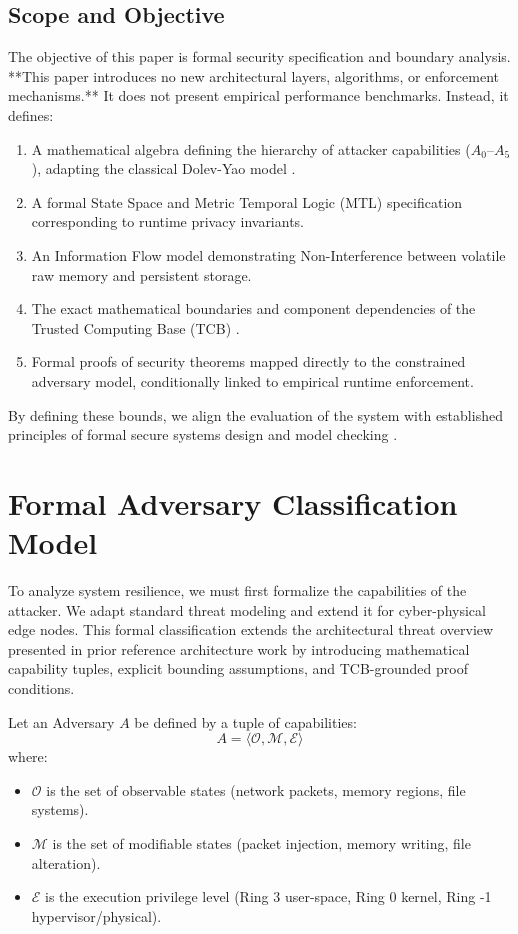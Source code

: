 \documentclass[conference]{IEEEtran}
\begin{document}
\subsection{Scope and Objective}
The objective of this paper is formal security specification and boundary analysis. **This paper introduces no new architectural layers, algorithms, or enforcement mechanisms.** It does not present empirical performance benchmarks. Instead, it defines:
\begin{enumerate}
    \item A mathematical algebra defining the hierarchy of attacker capabilities ($A_0$--$A_5$), adapting the classical Dolev-Yao model \cite{b2}.
    \item A formal State Space and Metric Temporal Logic (MTL) specification \cite{b9} corresponding to runtime privacy invariants.
    \item An Information Flow model demonstrating Non-Interference \cite{b8, b11} between volatile raw memory and persistent storage.
    \item The exact mathematical boundaries and component dependencies of the Trusted Computing Base (TCB) \cite{b3}.
    \item Formal proofs of security theorems mapped directly to the constrained adversary model, conditionally linked to empirical runtime enforcement.
\end{enumerate}

By defining these bounds, we align the evaluation of the system with established principles of formal secure systems design and model checking \cite{b10}.

\section{Formal Adversary Classification Model}
To analyze system resilience, we must first formalize the capabilities of the attacker. We adapt standard threat modeling \cite{b2} and extend it for cyber-physical edge nodes. This formal classification extends the architectural threat overview presented in prior reference architecture work \cite{b27_arch} by introducing mathematical capability tuples, explicit bounding assumptions, and TCB-grounded proof conditions.



Let an Adversary $A$ be defined by a tuple of capabilities:
\begin{equation}
A = \langle \mathcal{O}, \mathcal{M}, \mathcal{E} \rangle
\end{equation}
where:
\begin{itemize}
    \item $\mathcal{O}$ is the set of observable states (network packets, memory regions, file systems).
    \item $\mathcal{M}$ is the set of modifiable states (packet injection, memory writing, file alteration).
    \item $\mathcal{E}$ is the execution privilege level (Ring 3 user-space, Ring 0 kernel, Ring -1 hypervisor/physical).
\end{itemize}
\end{document}

